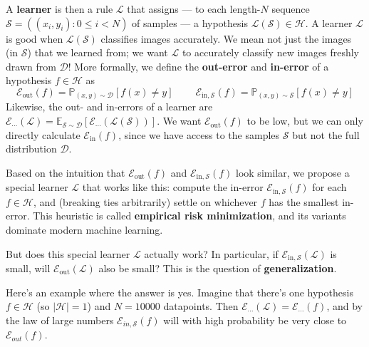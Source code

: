 \documentclass{article}
\newcommand{\EE}{\mathbb{E}}
\newcommand{\PP}{\mathbb{P}}
\newcommand{\Dd}{\mathcal{D}}
\newcommand{\Ee}{\mathcal{E}}
\newcommand{\Hh}{\mathcal{H}}
\newcommand{\Ll}{\mathcal{L}}
\newcommand{\Ss}{\mathcal{S}}
\begin{document}
            A \textbf{learner} is then a rule $\Ll$ that assigns --- to each
            length-$N$ sequence $\Ss = ((x_i, y_i): 0\leq i<N)$ of samples ---
            a hypothesis $\Ll(\Ss) \in \Hh$.
            A learner $\Ll$ is good when $\Ll(\Ss)$ classifies images
            accurately.  We mean not just the images (in $\Ss$) that we learned
            from; we want $\Ll$ to accurately classify new images freshly drawn
            from $\Dd$!  More formally, we define the \textbf{out-error} and
            \textbf{in-error} of a hypothesis $f \in \Hh$ as
            $$
                \Ee_{\text{out}}(f) = \PP_{(x,y)\sim\Dd}   
                                        \left[
                                            f(x) \neq y
                                        \right]
                ~~~~~~~~~~
                \Ee_{\text{in},\Ss}(f) = \PP_{(x,y)\sim\Ss}   
                                       \left[
                                           f(x) \neq y
                                       \right]
            $$
            Likewise, the out- and in-errors of a learner are
            $
                \Ee_{\cdots}(\Ll) = \EE_{\Ss\sim\Dd} \left[
                                        \Ee_{\cdots}(\Ll(\Ss)) 
                                    \right]
            $.
            We want $\Ee_{\text{out}}(f)$ to be low, but we can only directly
            calculate $\Ee_{\text{in}}(f)$, since we have access to the samples
            $\Ss$ but not the full distribution $\Dd$.

            Based on the intuition that $\Ee_{\text{out}}(f)$ and
            $\Ee_{\text{in},\Ss}(f)$ look similar, we propose a special learner
            $\Ll$ that works like this: compute the in-error
            $\Ee_{\text{in},\Ss}(f)$ for each $f\in \Hh$, and (breaking ties
            arbitrarily) settle on whichever $f$ has the smallest in-error.
            This heuristic is called \textbf{empirical risk minimization}, and
            its variants dominate modern machine learning.

            But does this special learner $\Ll$ actually work?  In particular,
            if $\Ee_{\text{in},\Ss}(\Ll)$ is small, will
            $\Ee_{\text{out}}(\Ll)$ also be small?  This is the question of
            \textbf{generalization}.

            Here's an example where the answer is yes.
                Imagine that there's one hypothesis $f\in \Hh$ (so $|\Hh| = 1$)
                and $N=10000$ datapoints.  Then $\Ee_{\cdots}(\Ll) =
                \Ee_{\cdots}(f)$, and by the law of large numbers
                $\Ee_{in,\Ss}(f)$ will with high probability be very close to
                $\Ee_{out}(f)$.
\end{document}
